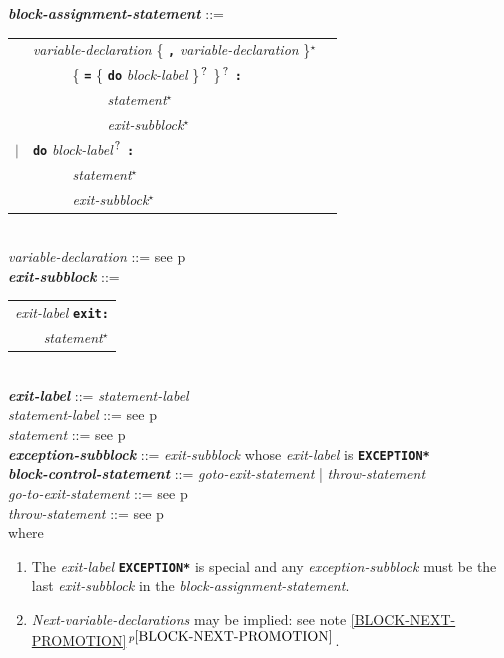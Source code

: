 \documentclass[12pt]{article}
\newcommand{\TT}[1]{{\tt \bfseries #1}}
\newcommand{\STAR}{{\Large $^\star$}}
\newcommand{\QMARK}{{$^{\,\mbox{\footnotesize ?}}$}}
\newcommand{\ttkey}[1]{{\tt \bfseries #1}}
\newcommand{\emkey}[1]{{\em \bfseries #1}}
\newcommand{\pagref}[1]{p\pageref{#1}}
\newcommand{\pagnote}[1]{$\,^{p\pageref{#1}}$}
\newenvironment{indpar}[1][0.3in]%
	{\begin{list}{}%
		     {\setlength{\itemsep}{0in}%
		      \setlength{\topsep}{0in}%
		      \setlength{\parsep}{1ex}%
		      \setlength{\labelwidth}{#1}%
		      \setlength{\leftmargin}{#1}%
		      \addtolength{\leftmargin}{\labelsep}}%
	 \item}%
	{\end{list}}
\begin{document}
\begin{indpar}
\emkey{block-assignment-statement} ::= \\
\hspace*{0.5in}\begin{tabular}[t]{@{}rll}
        & {\em variable-declaration}
                \{ \TT{,} {\em variable-declaration} \}\STAR{} \\
	& ~~~~~ \{ \TT{=} \{ \ttkey{do} {\em block-label} \}\QMARK{} \}\QMARK{}
		   \TT{:} \\
        & ~~~~~~~~~~ {\em statement}\STAR{} \\
        & ~~~~~~~~~~ {\em exit-subblock}\STAR{} \\
    $|$ & \ttkey{do} {\em block-label}\QMARK{} \TT{:} \\
        & ~~~~~ {\em statement}\STAR{} \\
        & ~~~~~ {\em exit-subblock}\STAR{} \\
    \end{tabular}
\\[0.5ex]
{\em variable-declaration} ::=
    see \pagref{VARIABLE-DECLARATION}
\\[0.5ex]
\emkey{exit-subblock}\label{EXIT-SUBBLOCK} ::=
    \begin{tabular}[t]{l}
    {\em exit-label} \ttkey{exit}\TT{:} \\
    \TT{~~~~}{\em statement}\STAR{} \\
    \end{tabular} \\
\emkey{exit-label} ::= {\em statement-label}
\\[0.5ex]
{\em statement-label} ::= see \pagref{STATEMENT-LABEL} \\
{\em statement} ::= see \pagref{STATEMENT}
\\[0.5ex]
\emkey{exception-subblock}\label{EXCEPTION-SUBBLOCK} ::=
    {\em exit-subblock} whose {\em exit-label} is \ttkey{*EXCEPTION*}
\\[0.5ex]
\emkey{block-control-statement}\label{BLOCK-CONTROL-STATEMENT}
	::= {\em goto-exit-statement} | {\em throw-statement} \\
{\em go-to-exit-statement} ::= see \pagref{GO-TO-STATEMENT} \\
{\em throw-statement} ::= see \pagref{THROW-STATEMENT}
\\[2.0ex]
where
\begin{enumerate}

\item The {\em exit-label} \ttkey{*EXCEPTION*} is special and
any {\em exception-subblock} must be the last {\em exit-subblock}
in the {\em block-assignment-statement}.

\item {\em Next-variable-declarations} may be implied: see
note \ref{BLOCK-NEXT-PROMOTION}\pagnote{BLOCK-NEXT-PROMOTION}.


\end{enumerate}
\end{indpar}
\end{document}
